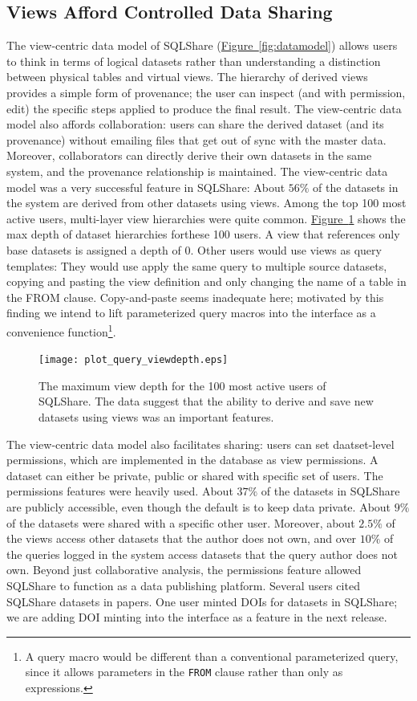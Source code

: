 \documentclass{sig-alternate}
\newcommand{\note}[2]{{\color{#1} {#2}}}
\newcommand{\reviewone}[1]{\note{black}{#1}}
\newcommand{\figref}[1]{\hyperref[#1]{Figure~\ref*{#1}}}
\newcommand{\sqlshare}{SQLShare}
\begin{document}
\subsection{Views Afford Controlled Data Sharing}
\label{sec:datasets}
\reviewone{The view-centric data model of \sqlshare{} (\figref{fig:datamodel}) allows users to think in terms of logical datasets rather than 
understanding a distinction between physical tables and virtual views.  
The hierarchy of derived views provides a simple form of provenance; the user can inspect (and with permission, edit) the specific steps applied to produce the final result.
The view-centric data model also affords collaboration: users can share the derived dataset (and its provenance) without emailing files that get out of sync with the master data.  Moreover, collaborators can directly derive their own datasets in the same system, and the provenance relationship is maintained.
The view-centric data model was a very successful feature in \sqlshare{}: About $56\%$ of the datasets in the system are derived from other datasets using views. Among the top 100 most active users, multi-layer view hierarchies were quite common.  \figref{fig:viewdepth} shows the max depth of dataset hierarchies forthese 100 users.  A view that references only base datasets is assigned a depth of 0. 
Other users would use views as query templates: They would use apply the same query to multiple source datasets, copying and pasting the view definition and only changing the name of a table in the FROM clause.
Copy-and-paste seems inadequate here; motivated by this finding we intend to lift parameterized query macros into the interface as a convenience function\footnote{A query macro would be different than a conventional parameterized query, since it allows parameters in the \texttt{FROM} clause rather than only as expressions.}.}
\begin{figure}[h]
\texttt{[image: plot\_query\_viewdepth.eps]}
\caption{The maximum view depth for the 100 most active users of \sqlshare{}. The data suggest that the ability to derive and save new datasets using views was an important features.}
\label{fig:viewdepth}
\end{figure}

\reviewone{The view-centric data model also facilitates sharing: users can set daatset-level permissions, which are implemented in the database as view permissions.
A dataset can either be private, public or shared with specific set of users. 
The permissions features were heavily used.  About $37\%$ of the datasets in \sqlshare{} are publicly accessible, even though the default is to keep data private. About $9\%$ of the datasets were shared with a specific other user.  Moreover, about $2.5\%$ of the views access other datasets that the author does not own, and over $10\%$ of the queries logged in the system access datasets that the query author does not own. 
Beyond just collaborative analysis, the permissions feature allowed \sqlshare{} to function as a data publishing platform. Several users cited \sqlshare{} datasets in papers.  One user minted DOIs for datasets in \sqlshare{}; we are adding DOI minting into the interface as a feature in the next release.}
\end{document}
